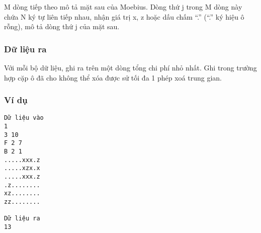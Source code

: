    M dòng tiếp theo mô tả mặt sau của Moebius. Dòng thứ j trong M dòng này chứa N ký tự liên tiếp nhau, nhận giá trị x, z hoặc dấu chấm “.” (“.” ký hiệu ô rỗng), mô tả dòng thứ j của mặt sau.  

\subsubsection{   Dữ liệu ra  }

   Với mỗi bộ dữ liệu, ghi ra trên một dòng tổng chi phí nhỏ nhất. Ghi   trong trường hợp cặp ô đã cho không thể xóa được sử tối đa 1 phép xoá trung gian.  

\subsubsection{   Ví dụ  }
\begin{verbatim}
Dữ liệu vào
1
3 10
F 2 7
B 2 1
.....xxx.z
.....xzx.x
.....xxx.z
.z........
xz........
zz........	

Dữ liệu ra
13
\end{verbatim}